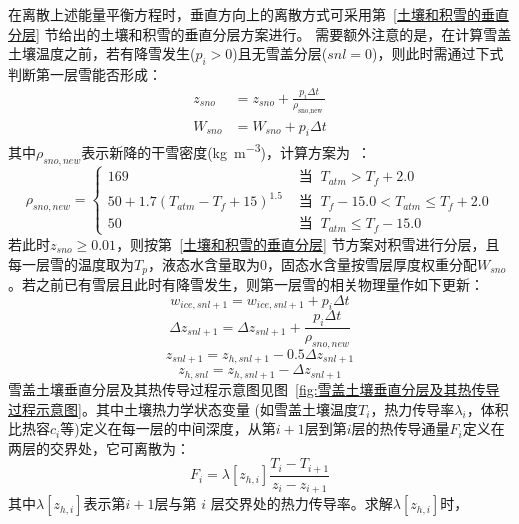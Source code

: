 在离散上述能量平衡方程时，垂直方向上的离散方式可采用第~\ref{土壤和积雪的垂直分层} 节给出的土壤和积雪的垂直分层方案进行。
需要额外注意的是，在计算雪盖土壤温度之前，若有降雪发生($p_i>0$)且无雪盖分层($snl=0$)，则此时需通过下式判断第一层雪能否形成：
\begin{equation}
\begin{aligned}
z_{sno} &= z_{sno}+\frac{p_{i} \Delta t}{\rho_{\text {sno,new }}} \\[1ex] 
W_{sno} &= W_{sno}+p_{i} \Delta t
\end{aligned}
\end{equation}
其中$\rho_{sno,new}$表示新降的干雪密度(\unit{kg.m^{-3}})，计算方案为~\citep{anderson1976point}：
\begin{equation}
\rho_{sno, new}=\begin{cases}
169 & \text { 当 }\ T_{atm}>T_{f}+2.0 \\ 
50+1.7\left(T_{atm}-T_{f}+15\right)^{1.5}  & \text { 当 }\ T_{f}-15.0<T_{atm} \leqslant T_{f}+2.0 \\ 
50 & \text { 当 }\ T_{atm} \leqslant T_{f}-15.0
\end{cases}
\end{equation}
若此时$z_{sno} \geqslant 0.01$，则按第~\ref{土壤和积雪的垂直分层} 节方案对积雪进行分层，且每一层雪的温度取为$T_p$，液态水含量取为0，固态水含量按雪层厚度权重分配$W_{sno}$。若之前已有雪层且此时有降雪发生，则第一层雪的相关物理量作如下更新：
\begin{equation}
w_{ice, snl+1}=w_{ice, snl+1}+p_{i} \Delta t
\end{equation}
\begin{equation}
\Delta z_{snl+1}=\Delta z_{snl+1}+\frac{p_{i} \Delta t}{\rho_{sno, new}}
\end{equation}
\begin{equation}
z_{snl+1}=z_{h, snl+1}-0.5 \Delta z_{snl+1}
\end{equation}
\begin{equation}
z_{h, snl}=z_{h, snl+1}-\Delta z_{snl+1}
\end{equation}
雪盖土壤垂直分层及其热传导过程示意图见图~\ref{fig:雪盖土壤垂直分层及其热传导过程示意图}。其中土壤热力学状态变量
(如雪盖土壤温度$T_i$，热力传导率$\lambda_i$，体积比热容$c_i$等)定义在每一层的中间深度，从第$i+1$层到第$i$层的热传导通量$F_i$定义在两层的交界处，它可离散为：
\begin{equation}
F_{i}=\lambda\left[z_{h, i}\right] \frac{T_{i}-T_{i+1}}{z_{i}-z_{i+1}}
\end{equation}
其中$\lambda\left[z_{h,i}\right]$表示第$i+1$层与第 $i$ 层交界处的热力传导率。求解$\lambda\left[z_{h,i}\right]$时，
